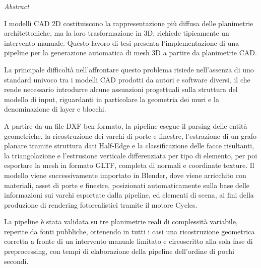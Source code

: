 \makeatletter
\newcommand{\beginitalianAbstract}{%
  \thispagestyle{plain}%
  \begin{center}
    \setlength{\parskip}{0pt}
    {\huge\textit{Abstract}\par}
    \bigskip
    \bigskip
  \end{center}
}
\makeatother


\beginitalianAbstract
{}

I modelli CAD 2D costituiscono la rappresentazione più diffusa delle planimetrie architettoniche, ma la loro trasformazione in 3D, richiede tipicamente un intervento manuale. Questo lavoro di tesi presenta l'implementazione di una pipeline per la generazione automatica di mesh 3D a partire da planimetrie CAD.

La principale difficoltà nell'affrontare questo problema risiede nell'assenza di uno standard univoco tra i modelli CAD prodotti da autori e software diversi, il che rende necessario introdurre alcune assunzioni progettuali sulla struttura del modello di input, riguardanti in particolare la geometria dei muri e la denominazione di layer e blocchi.

A partire da un file DXF ben formato, la pipeline esegue il parsing delle entità geometriche, la ricostruzione dei varchi di porte e finestre, l'estrazione di un grafo planare tramite struttura dati Half-Edge e la classificazione delle facce risultanti, la triangolazione e l'estrusione verticale differenziata per tipo di elemento, per poi esportare la mesh in formato GLTF, completa di normali e coordinate texture. Il modello viene successivamente importato in Blender, dove viene arricchito con materiali, asset di porte e finestre, posizionati automaticamente sulla base delle informazioni sui varchi esportate dalla pipeline, ed elementi di scena, ai fini della produzione di rendering fotorealistici tramite il motore Cycles.

La pipeline è stata validata su tre planimetrie reali di complessità variabile, reperite da fonti pubbliche, ottenendo in tutti i casi una ricostruzione geometrica corretta a fronte di un intervento manuale limitato e circoscritto alla sola fase di preprocessing, con tempi di elaborazione della pipeline dell'ordine di pochi secondi.

